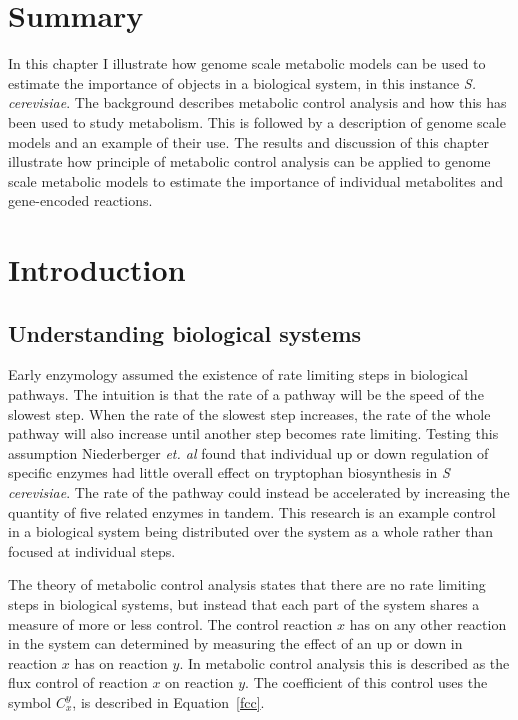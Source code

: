\section*{Summary}

In this chapter I illustrate how genome scale metabolic models can be used to estimate the importance of objects in a biological system, in this instance \emph{S. cerevisiae}. The background describes metabolic control analysis and how this has been used to study metabolism. This is followed by a description of genome scale models and an example of their use. The results and discussion of this chapter illustrate how principle of metabolic control analysis can be applied to genome scale metabolic models to estimate the importance of individual metabolites and gene-encoded reactions.

\clearpage

\section{Introduction}

\subsection{Understanding biological systems}

Early enzymology assumed the existence of rate limiting steps in biological pathways. The intuition is that the rate of a pathway will be the speed of the slowest step. When the rate of the slowest step increases, the rate of the whole pathway will also increase until another step becomes rate limiting. Testing this assumption Niederberger \emph{et. al} \cite{niederberger1992} found that individual up or down regulation of specific enzymes had little overall effect on tryptophan biosynthesis in \emph{S cerevisiae}. The rate of the pathway could instead be accelerated by increasing the quantity of five related enzymes in tandem. This research is an example control in a biological system being distributed over the system as a whole rather than focused at individual steps.

The theory of metabolic control analysis \cite{fell1992,fell1997} states that there are no rate limiting steps in biological systems, but instead that each part of the system shares a measure of more or less control. The control reaction $x$ has on any other reaction in the system can determined by measuring the effect of an up or down in reaction $x$ has on reaction $y$. In metabolic control analysis this is described as the flux control of reaction $x$ on reaction $y$. The coefficient of this control uses the symbol $C_{x}^{y}$, is described in Equation~\vref{fcc}.


